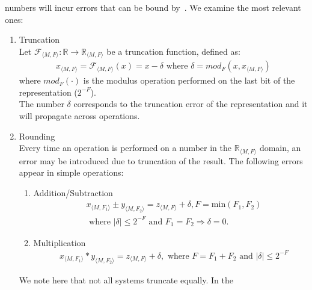 \documentclass[sigconf]{llncs}
\begin{document}
numbers will incur errors that can be bound
by~\cite{DBLP:conf/arith/BrainTRW15}.  We examine the most relevant ones:
%
\begin{enumerate}
\item Truncation\\
Let $\mathcal{F}_{\langle M,F \rangle} : \mathbb{R} \rightarrow \mathbb{R}_{\langle M,F \rangle}$
be a truncation function, defined as:
\begin{align*}
x_{\langle M,F \rangle}=\mathcal{F}_{\langle M,F \rangle}(x) = x-\delta \text{ where } \delta=mod_F(x, x_{\langle M,F \rangle})
\end{align*} 
where $mod_F(\cdot)$ is the modulus operation performed on the last bit of the representation ($2^{-F}$).\\
The number $\delta$ corresponds to the truncation error of the representation and it will propagate across operations.
\item Rounding\\
Every time an operation is performed on a number in the $\mathbb{R}_{\langle M,F \rangle}$ domain, an error may be
introduced due to truncation of the result. 
The following errors appear in simple operations:
\begin{enumerate}
\item Addition/Subtraction
\begin{align*}
&x_{\langle M,F_1\rangle} \pm y_{\langle M,F_2\rangle}=z_{\langle M,F\rangle} + \delta,  F=\text{min}(F_1,F_2)\\
&\text{ where } |\delta| \leq 2^{-F} \text{ and } F_1=F_2 \Rightarrow \delta=0.
\end{align*}
\item Multiplication
\begin{align*}
&x_{\langle M,F_1\rangle} * y_{\langle M,F_2\rangle}=z_{\langle M,F\rangle} + \delta, \text{ where } F=F_1+F_2 \text{ and } |\delta| \leq 2^{-F}
\end{align*}
\end{enumerate}
We note here that not all systems truncate equally.  In the

\end{enumerate}
\end{document}
